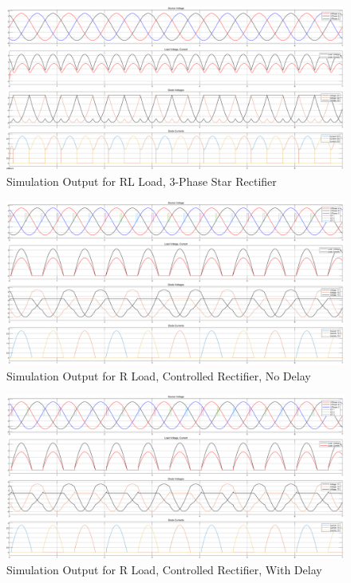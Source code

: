 \documentclass[12pt]{article}
\begin{document}
\begin{figure}[H]
    \centering
    \includegraphics[width=\textwidth]{rl.png}
    \caption{Simulation Output for RL Load, 3-Phase Star Rectifier}
    \label{fig:rlLoad}
\end{figure}

\begin{figure}[H]
    \centering
    \includegraphics[width=\textwidth]{r-nd.png}
    \caption{Simulation Output for R Load, Controlled Rectifier, No Delay}
    \label{fig:rControlledNoDelay}
\end{figure}

\begin{figure}[H]
    \centering
    \includegraphics[width=\textwidth]{r-d.png}
    \caption{Simulation Output for R Load, Controlled Rectifier, With Delay}
    \label{fig:rControlledWithDelay}
\end{figure}
\end{document}
